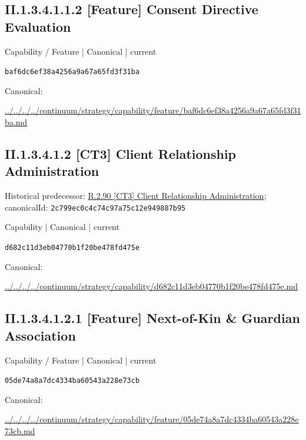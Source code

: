 \documentclass[10pt,a4paper]{article}
\begin{document}
\subsection*{II.1.3.4.1.1.2 [Feature] Consent Directive Evaluation}
\label{element-baf6dc6ef38a4256a9a67a65fd3f31ba}
{\small Capability / Feature | Canonical | current}\par
\texttt{baf6dc6ef38a4256a9a67a65fd3f31ba}\par
Canonical: \par
{\footnotesize\url{../../../../continuum/strategy/capability/feature/baf6dc6ef38a4256a9a67a65fd3f31ba.md}}\par
\subsection*{II.1.3.4.1.2 [CT3] Client Relationship Administration}
Historical predecessor: \hyperref[element-2c799ec0c4c74c97a75c12e949887b95]{R.2.90 [CT3] Client Relationship Administration}; canonicalId: \texttt{2c799ec0c4c74c97a75c12e949887b95}\par
\label{element-d682c11d3eb04770b1f20be478fd475e}
{\small Capability | Canonical | current}\par
\texttt{d682c11d3eb04770b1f20be478fd475e}\par
Canonical: \par
{\footnotesize\url{../../../../continuum/strategy/capability/d682c11d3eb04770b1f20be478fd475e.md}}\par
\subsection*{II.1.3.4.1.2.1 [Feature] Next-of-Kin \& Guardian Association}
\label{element-05de74a8a7dc4334ba60543a228e73cb}
{\small Capability / Feature | Canonical | current}\par
\texttt{05de74a8a7dc4334ba60543a228e73cb}\par
Canonical: \par
{\footnotesize\url{../../../../continuum/strategy/capability/feature/05de74a8a7dc4334ba60543a228e73cb.md}}\par
\end{document}
